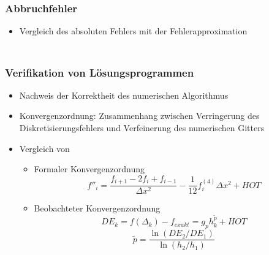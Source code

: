 \documentclass[accentcolor=tud2c,colorbacktitle,inverttitle,landscape,ngerman,presentation,t]{tudbeamer}
\begin{document}
\begin{frame}
  \frametitle{\\Abbruchfehler}
  \begin{itemize}
    \item Vergleich des absoluten Fehlers mit der Fehlerapproximation
  \end{itemize}
\begin{figure}[h]
\centering
 \label{fig:taylor_example_te}
\end{figure}
\end{frame}


\begin{frame}
  \frametitle{\\Verifikation von Lösungsprogrammen}
    \begin{itemize}
      \item Nachweis der Korrektheit des numerischen Algorithmus
      \item Konvergenzordnung: Zusammenhang zwischen
        Verringerung des Diskretisierungsfehlers und Verfeinerung des numerischen Gitters
      \item Vergleich von
      \begin{itemize}
        \item Formaler Konvergenzordnung
          \begin{equation*}
            f''_i = \frac{f_{i+1}-2f_i +f_{i-1}}{\Delta x^2} -\frac{1}{12} f^{(4)}_i \Delta x^2 + HOT
\end{equation*}
        \item Beobachteter Konvergenzordnung
          \begin{equation*}
            DE_k=f(\Delta_k) - f_{exakt} = g_p h_k^{\tilde{p}} + HOT
\end{equation*}
\begin{equation*}
  \tilde{p}=\frac{\ln \left(DE_2/DE_1\right)}{\ln \left(h_2 / h_1\right)}
  \label{eq:beobachtet}
\end{equation*}
      \end{itemize}
    \end{itemize}
\end{frame}
\end{document}
